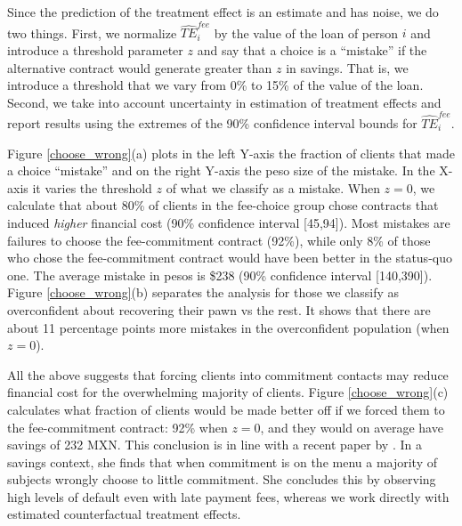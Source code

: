 \documentclass[oneside,11pt]{article}
\begin{document}


Since the prediction of the treatment effect is an estimate and has noise, we do two things. First, we normalize $\widehat{TE}^{fee}_{i}$ by the value of the loan of person $i$ and introduce a threshold parameter $z$ and say that a choice is a ``mistake'' if the alternative contract would generate greater than $z$ in savings. That is, we introduce a threshold that we vary from 0\% to 15\% of the value of the loan. Second, we take into account uncertainty in estimation of treatment effects and report results using the extremes of the 90\% confidence interval bounds for $\widehat{TE}^{fee}_{i}$. 

Figure \ref{choose_wrong}(a) plots in the left Y-axis the fraction of clients that made a choice ``mistake'' and on the right Y-axis the peso size of the mistake. In the X-axis it varies the threshold $z$ of what we classify as a mistake. When $z=0$, we calculate that about 80\% of clients in the fee-choice group chose contracts that induced \textit{higher} financial cost (90\% confidence interval [45,94]). Most mistakes are failures to choose the fee-commitment contract (92\%), while only 8\% of those who chose the fee-commitment contract would have been better in the status-quo one. The average mistake in pesos is \$238 (90\% confidence interval [140,390]). Figure \ref{choose_wrong}(b) separates the analysis for those we classify as overconfident about recovering their pawn vs the rest. It shows that there are about 11 percentage points more mistakes in the overconfident population (when $z=0$).

All the above suggests that forcing clients into commitment contacts may reduce financial cost for the overwhelming majority of clients. Figure \ref{choose_wrong}(c) calculates what fraction of clients would be made better off if we forced them to the fee-commitment contract: 92\% when $z=0$, and they would on average have savings of 232 MXN. This conclusion is in line with a recent paper by \cite{John}. In a savings context, she finds that when commitment is on the menu a majority of subjects wrongly choose to little commitment. She concludes this by observing high levels of default even with late payment fees, whereas we work directly with estimated counterfactual treatment effects.
\end{document}
